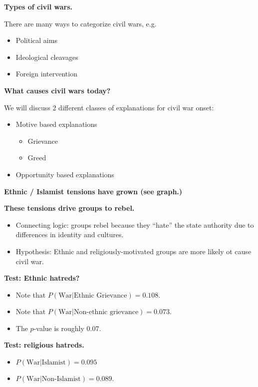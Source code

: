 \documentclass{article}
\begin{document}
{\bf Types of civil wars.}

There are many ways to categorize civil wars, e.g.

\begin{itemize}
  \item Political aims
  \item Ideological cleavages
  \item Foreign intervention
\end{itemize}

{\bf What causes civil wars today?}

We will discuss 2 different classes of explanations for civil war onset:

\begin{itemize}
  \item Motive based explanations
    \begin{itemize}
      \item Grievance
      \item Greed
    \end{itemize}
  \item Opportunity based explanations
\end{itemize}

{\bf Ethnic / Islamist tensions have grown (see graph.)}

{\bf These tensions drive groups to rebel.}

\begin{itemize}
  \item Connecting logic: groups rebel because they ``hate'' the state authority due to differences in identity and cultures.
  \item Hypothesis: Ethnic and religiously-motivated groups are more likely ot cause civil war.
\end{itemize}

{\bf Test: Ethnic hatreds?}

\begin{itemize}
  \item Note that $P(\text{War} | \text{Ethnic Grievance}) = 0.108$.
  \item Note that $P(\text{War} | \text{Non-ethnic grievance}) = 0.073$.
  \item The $p$-value is roughly $0.07$.
\end{itemize}

{\bf Test: religious hatreds.}

\begin{itemize}
  \item $P(\text{War} | \text{Islamist}) = 0.095$
  \item $P(\text{War} | \text{Non-Islamist}) = 0.089$.
\end{itemize}
\end{document}
